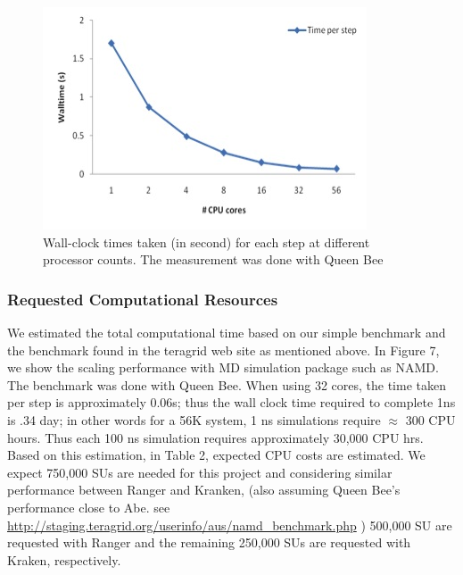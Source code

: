 \documentclass[a4paper,10pt]{article}
\begin{document}

\begin{figure}
  \includegraphics[scale=0.660]{56k_scaling-2} \caption{Wall-clock times taken (in second) for each step at different processor counts. The measurement was done with Queen Bee }
\end{figure}


\subsubsection*{Requested Computational Resources}

We estimated the total computational time based on our simple benchmark and the benchmark found in the teragrid web site as mentioned above.  In Figure 7, we show the scaling performance with MD simulation package such as NAMD.  The benchmark was done with Queen Bee.  When using 32 cores, the time taken per step is approximately 0.06s; thus the wall clock time required to complete 1ns is .34 day; in other words for a 56K system, 1 ns simulations require $\approx$ 300 CPU hours.  Thus each 100 ns simulation requires approximately 30,000 CPU hrs.  Based on this estimation, in Table 2, expected CPU costs are estimated.  We expect 750,000 SUs are needed for this project and considering similar performance between Ranger and Kranken, (also assuming Queen Bee's performance close to Abe. see {\url{http://staging.teragrid.org/userinfo/aus/namd_benchmark.php}} ) 500,000 SU are requested with Ranger and the remaining 250,000 SUs are requested with Kraken, respectively.
\end{document}
